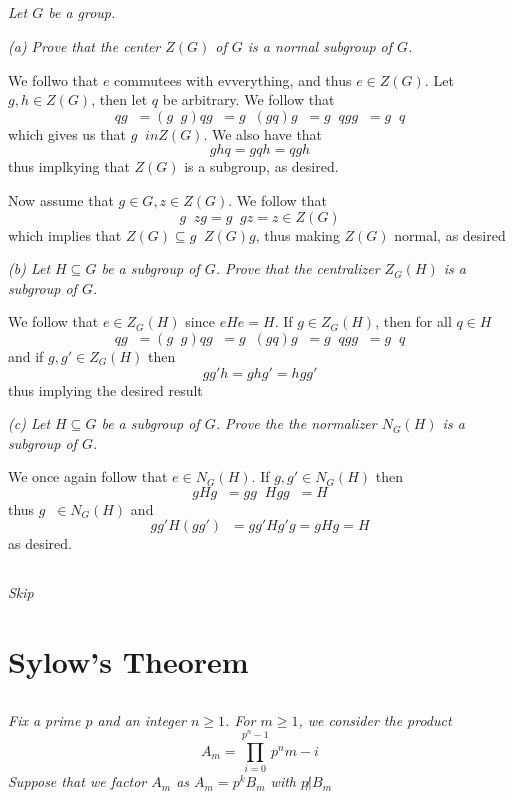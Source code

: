 \documentclass[11pt,oneside,titlepage]{book}
\DeclareMathOperator \inv {^{-1}}
\begin{document}
\subsection{}

\textit{Let $G$ be a group.}

\textit{(a) Prove that the center $Z(G)$ of $G$ is a normal subgroup of $G$.}

We follwo that $e$ commutees with evverything, and thus $e \in Z(G)$.
Let $g, h \in Z(G)$, then let $q$ be arbitrary. We follow that
$$q g\inv = (g\inv g )q g\inv = g\inv (g q) g\inv = g\inv qg  g\inv = g\inv q$$
which gives us that $g\inv in Z(G)$. We also have that
$$ghq = gqh = qgh$$
thus implkying that $Z(G)$ is a subgroup, as desired.

Now assume that $g \in G, z \in Z(G)$. We follow that
$$g\inv z g = g\inv g z = z \in Z(G)$$
which implies that $Z(G) \subseteq g\inv Z(G) g$, thus making $Z(G)$
normal, as desired

\textit{(b) Let $H \subseteq G$ be a subgroup of $G$. Prove that
  the centralizer $Z_G(H)$ is a subgroup of $G$. }

We follow that $e \in Z_G(H)$ since $eHe = H$. If $g \in Z_G(H)$, then
for all $q \in H$
$$q g\inv = (g\inv g )q g\inv = g\inv (g q) g\inv = g\inv qg  g\inv = g\inv q$$
and if $g, g' \in Z_G(H)$ then
$$gg'h = ghg' = hgg'$$
thus implying the desired result

\textit{(c) Let $H \subseteq G$ be a subgroup of $G$.  Prove the the
  normalizer $N_G(H)$ is a subgroup of $G$.}

We once again follow that $e \in N_G(H)$. If $g, g' \in N_G(H)$ then
$$g H g\inv = g g\inv H g g\inv = H$$
thus $g\inv \in N_G(H)$ and
$$g g' H (g g') \inv = g g' H g' g = g H g = H$$
as desired.

\subsection{}

\textit{Skip}

\section{Sylow's Theorem}

\subsection{}

\textit{Fix a prime $p$ and an integer $n \geq 1$. For $m \geq 1$, we
  consider the product
  $$A_m = \prod_{i = 0}^{p^n - 1}{p^nm - i}$$
  Suppose that we factor $A_m$ as $A_m = p^kB_m$ with $p \not | B_m$
}
\end{document}
